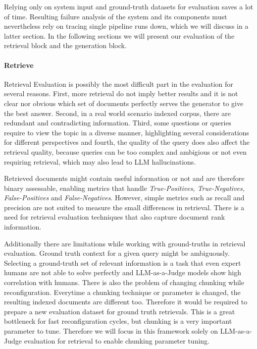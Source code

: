 Relying only on system input and ground-truth datasets for evaluation saves a lot of time. Resulting failure analysis of the system and its components must nevertheless rely on tracing single pipeline runs down, which we will discuss in a latter section. In the following sections we will present our evaluation of the retrieval block and the generation block.


\paragraph{Retrieve}
Retrieval Evaluation is possibly the most difficult part in the evaluation for several reasons. First, more retrieval do not imply better results and it is not clear nor obvious which set of documents perfectly serves the generator to give the best answer.\cite{Jin.5222024} Second, in a real world scenario indexed corpus, there are redundant and contradicting information.\cite{Yu.2024} Third, some questions or queries require to view the topic in a diverse manner, highlighting several considerations for different perspectives and fourth, the quality of the query does also affect the retrieval quality, because queries can be too complex and ambigious or not even requiring retrieval, which may also lead to LLM hallucinations.\cite{Huang.2023, Mallen.20.12.2022}

Retrieved documents might contain useful information or not and are therefore binary assessable, enabling metrics that handle \textit{True-Positives, True-Negatives, False-Positives} and \textit{False-Negatives}. However, simple metrics such as recall and precision are not suited to measure the small differences in retrieval.\cite{Yu.2024} There is a need for retrieval evaluation techniques that also capture document rank information.

Additionally there are limitations while working with ground-truths in retrieval evaluation. Ground truth context for a given query might be ambiguously. Selecting a ground-truth set of relevant information is a task that even expert humans are not able to solve perfectly and LLM-as-a-Judge models show high correlation with humans.\cite{Chiang.2023} There is also the problem of changing chunking while reconfiguration. Everytime a chunking technique or parameter is changed, the resulting indexed documents are different too. Therefore it would be required to prepare a new evaluation dataset for ground truth retrievals. This is a great bottleneck for fast reconfiguration cycles, but chunking is a very important parameter to tune. Therefore we will focus in this framework solely on LLM-as-a-Judge evaluation for retrieval to enable chunking parameter tuning.


